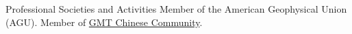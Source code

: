 \begin{rubric}{Professional Societies and Activities}
\entry*[2017 -- present] Member of the American Geophysical Union (AGU).
\entry*[2017 -- present] Member of \href{http://gmt-china.org/}{GMT Chinese Community}.
\end{rubric}
